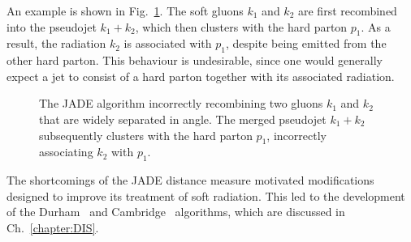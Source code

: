 An example is shown in Fig.~\ref{fig:JADE}. The soft gluons $k_1$ and
$k_2$ are first recombined into the pseudojet $k_1+k_2$, which then
clusters with the hard parton $p_1$. As a result, the radiation $k_2$ is
associated with $p_1$, despite being emitted from the other hard parton.
This behaviour is undesirable, since one would generally expect a jet to
consist of a hard parton together with its associated radiation.
\begin{figure}[h]
\centering
{}
\caption{The JADE algorithm incorrectly recombining two gluons $k_1$ and 
$k_2$ that are widely separated in angle. The merged pseudojet 
$k_1+k_2$ subsequently clusters with the hard parton $p_1$, 
incorrectly associating $k_2$ with $p_1$.}
\label{fig:JADE}
\end{figure}

The shortcomings of the JADE distance measure motivated modifications
designed to improve its treatment of soft radiation. This led to the
development of the Durham~\cite{Catani:1991hj,Brown:1991hx} and
Cambridge~\cite{Dokshitzer:1997in} algorithms, which are 
discussed in Ch.~\ref{chapter:DIS}.

